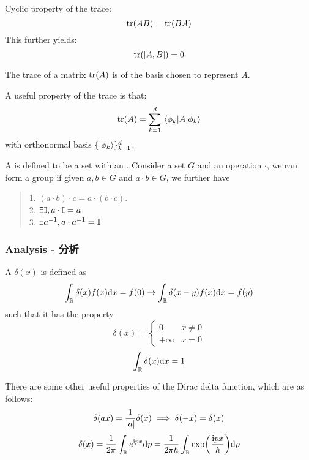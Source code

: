 \begin{theorem}
    Cyclic property of the trace:
    $$\tr(AB) = \tr(BA)$$
    This further yields:
    $$\tr([A,B]) = 0$$
\end{theorem}
\begin{theorem}
    The trace of a matrix $\tr(A)$ is  of the basis chosen to represent $A$.
\end{theorem}
A useful property of the trace is that:
$$\tr(A) = \Sum{k=1}{d} \ev{A}{\phi_k}$$
with orthonormal basis $\{\ket{\phi_k}\}_{k=1}^d$.
\begin{definition}
    A  is defined to be a set with an . Consider a set $G$ and an operation $\cdot$, we can form a group if given $a, b \in G$ and $a \cdot b \in G$, we further have
    \begin{quote}
        1. $(a \cdot b) \cdot c = a \cdot (b \cdot c)$. \\
        2. $\exists \mathbb{I}, a \cdot \mathbb{I} = a$ \\
        3. $\exists a^{-1}, a \cdot a^{-1} = \mathbb{I}$
    \end{quote}
\end{definition}

\newpage
\subsubsection{Analysis - 分析}
\label{subsec:dirac-delta}
\begin{definition}
    A  $\delta(x)$ is defined as
    $$\int_{\mathbb{R}} \delta(x) f(x) \dd x = f(0) \to \int_{\mathbb{R}} \delta(x-y)f(x) \dd x = f(y)$$
    such that it has the property
    $$\delta(x) = \begin{cases}
        0 & x \ne 0 \\
        +\infty & x = 0
    \end{cases}$$
    $$\int_{\mathbb{R}} \delta(x) \dd x = 1$$
\end{definition}
There are some other useful properties of the Dirac delta function, which are as follows:
$$\delta(ax) = \frac{1}{\abs{a}}\delta(x) \implies \delta(-x) = \delta(x)$$
$$\delta(x) = \frac{1}{2\pi} \int_{\mathbb{R}} e^{\mathrm{i} px} \dd p = \frac{1}{2\pi\hbar} \int_{\mathbb{R}} \exp(\frac{\mathrm{i} p x}{\hbar}) \dd p$$

